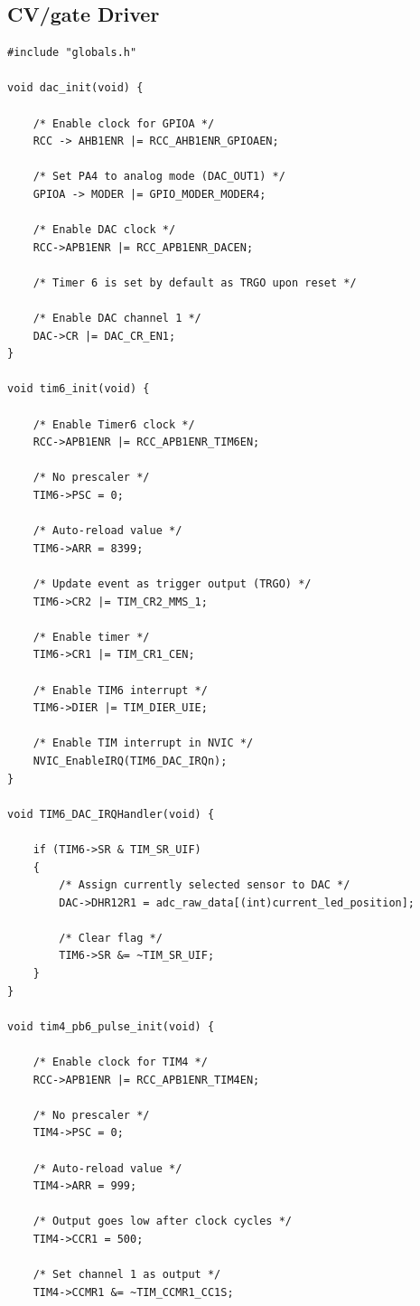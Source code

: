 \documentclass[12pt]{article}
\numberwithin{subsubsubsection}{subsubsection}
\begin{document}
\newpage
\subsection{CV/gate Driver}
\begin{verbatim}
#include "globals.h"

void dac_init(void) {

    /* Enable clock for GPIOA */
    RCC -> AHB1ENR |= RCC_AHB1ENR_GPIOAEN;
    
    /* Set PA4 to analog mode (DAC_OUT1) */
    GPIOA -> MODER |= GPIO_MODER_MODER4;
    
    /* Enable DAC clock */
    RCC->APB1ENR |= RCC_APB1ENR_DACEN;
    
    /* Timer 6 is set by default as TRGO upon reset */
    
    /* Enable DAC channel 1 */
    DAC->CR |= DAC_CR_EN1;
}

void tim6_init(void) {

    /* Enable Timer6 clock */
    RCC->APB1ENR |= RCC_APB1ENR_TIM6EN;

    /* No prescaler */
    TIM6->PSC = 0;

    /* Auto-reload value */
    TIM6->ARR = 8399;

    /* Update event as trigger output (TRGO) */
    TIM6->CR2 |= TIM_CR2_MMS_1;

    /* Enable timer */
    TIM6->CR1 |= TIM_CR1_CEN;

    /* Enable TIM6 interrupt */
    TIM6->DIER |= TIM_DIER_UIE;

    /* Enable TIM interrupt in NVIC */
    NVIC_EnableIRQ(TIM6_DAC_IRQn);
}

void TIM6_DAC_IRQHandler(void) {

    if (TIM6->SR & TIM_SR_UIF)
    {
        /* Assign currently selected sensor to DAC */
        DAC->DHR12R1 = adc_raw_data[(int)current_led_position];
    
        /* Clear flag */
        TIM6->SR &= ~TIM_SR_UIF;
    }
}

void tim4_pb6_pulse_init(void) {

    /* Enable clock for TIM4 */
    RCC->APB1ENR |= RCC_APB1ENR_TIM4EN;

    /* No prescaler */
    TIM4->PSC = 0;

    /* Auto-reload value */
    TIM4->ARR = 999;

    /* Output goes low after clock cycles */
    TIM4->CCR1 = 500;

    /* Set channel 1 as output */
    TIM4->CCMR1 &= ~TIM_CCMR1_CC1S;


\end{verbatim}
\end{document}
